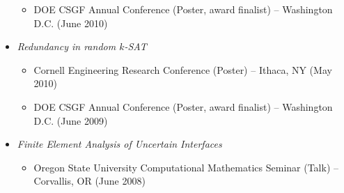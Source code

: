 \documentclass[letterpaper,11pt]{article}
\begin{document}
\begin{itemize}
\begin{itemize}
		\item DOE CSGF Annual Conference (Poster, award finalist) -- Washington D.C. (June 2010)
	\end{itemize}
\item
	{\it Redundancy in random $k$-SAT}
	\begin{itemize}
		\item Cornell Engineering Research Conference (Poster) -- Ithaca, NY (May 2010)
		\item DOE CSGF Annual Conference (Poster, award finalist) -- Washington D.C. (June 2009)
	\end{itemize}
\item
	{\it Finite Element Analysis of Uncertain Interfaces}
	\begin{itemize}
		\item Oregon State University Computational Mathematics Seminar (Talk) -- Corvallis, OR (June 2008)
	\end{itemize}

\end{itemize}
\end{document}
